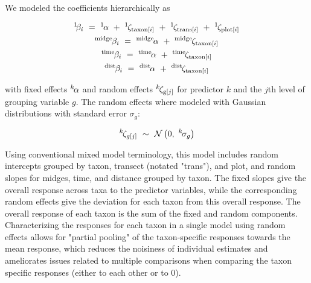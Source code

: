 {We modeled the coefficients hierarchically as

\begin{equation} \label{eq:betas}
\begin{gathered}
{}^1\hspace*{-1pt}\hspace*{-1pt}\beta_i~=~{}^1\hspace*{-1pt}\alpha~+~{}^1\hspace*{-1pt}\zeta_{\text{taxon}[i]}~+~
        {}^1\hspace*{-1pt}\zeta_{\text{trans}[i]}~+~{}^1\hspace*{-1pt}\zeta_{\text{plot}[i]} \\
{}^\text{midge}\hspace*{-1pt}\beta_i~=~{}^\text{midge}\hspace*{-1pt}\alpha~+~
        {}^\text{midge}\hspace*{-1pt}\zeta_{\text{taxon}[i]} \\
{}^\text{time}\hspace*{-1pt}\beta_i~=~{}^\text{time}\hspace*{-1pt}\alpha~+~
        {}^\text{time}\hspace*{-1pt}\zeta_{\text{taxon}[i]} \\
{}^\text{dist}\hspace*{-1pt}\beta_i~=~{}^\text{dist}\hspace*{-1pt}\alpha~+~
        {}^\text{dist}\hspace*{-1pt}\zeta_{\text{taxon}[i]}
\end{gathered}
\end{equation}

\noindent with fixed effects ${}^k\hspace*{-1pt}\alpha$ and random effects ${}^k\hspace*{-1pt}\zeta_{\text{g}[j]}$ for predictor $k$ and the $j$th level of grouping variable $g$. The random effects where modeled with Gaussian distributions with standard error $\sigma_g$:

\begin{equation} \label{eq:zetas}
{}^k\hspace*{-1pt}\zeta_{g[j]}~\sim~\mathcal{N}\left(0,~{}^k\hspace*{-1pt}\sigma_g\right)
\end{equation}

Using conventional mixed model terminology, this model includes random intercepts grouped by taxon, transect (notated
"trans"), and plot, and random slopes for midges, time, and distance grouped by taxon. The fixed slopes give the overall
response across taxa to the predictor variables, while the corresponding random effects give the deviation for each taxon from
this overall response. The overall response of each taxon is the sum of the fixed and random components.
Characterizing the responses for each taxon in a single model using random effects allows for "partial pooling" of the
taxon-specific responses towards the mean response, which reduces the noisiness of individual estimates and ameliorates issues
related to multiple comparisons when comparing the taxon specific responses (either to each other or to 0).

}
